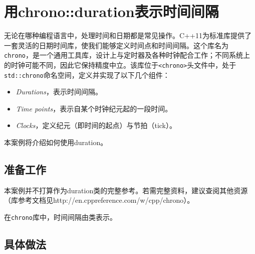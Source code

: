 
\section{用chrono::duration表示时间间隔}



无论在哪种编程语言中，处理时间和日期都是常见操作。C++11为标准库提供了一套灵活的日期时间库，使我们能够定义时间点和时间间隔。这个库名为\texttt{chrono}，是一个通用工具库，设计上与定时器及各种时钟配合工作；不同系统上的时钟可能不同，因此它保持精度中立。该库位于\texttt{<\allowbreak{}chrono>}头文件中，处于\texttt{std::\allowbreak{}chrono}命名空间，定义并实现了以下几个组件：



\begin{itemize}
\item \textit{Durations}，表示时间间隔。



\item \textit{Time points}，表示自某个时钟纪元起的一段时间。



\item \textit{Clocks}，定义纪元（即时间的起点）与节拍（tick）。

\end{itemize}



本案例将介绍如何使用duration。



\subsection{准备工作}



本案例并不打算作为duration类的完整参考。若需完整资料，建议查阅其他资源（库参考文档见http://\allowbreak{}en.\allowbreak{}cppreference.\allowbreak{}com/\allowbreak{}w/\allowbreak{}cpp/\allowbreak{}chrono）。



在\texttt{chrono}库中，时间间隔由类表示。



\subsection{具体做法}


